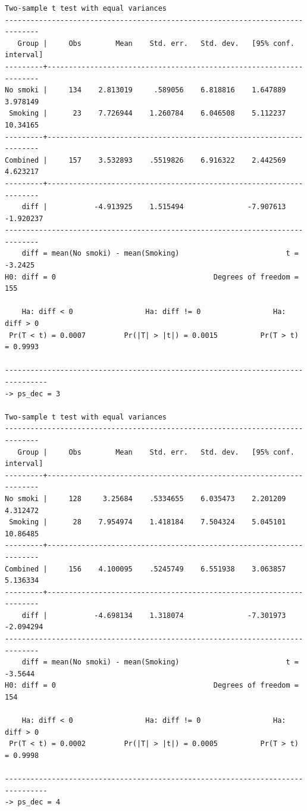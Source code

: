 \documentclass[
  10pt,
]{book}
\begin{document}
\begin{verbatim}
Two-sample t test with equal variances
------------------------------------------------------------------------------
   Group |     Obs        Mean    Std. err.   Std. dev.   [95% conf. interval]
---------+--------------------------------------------------------------------
No smoki |     134    2.813019     .589056    6.818816    1.647889    3.978149
 Smoking |      23    7.726944    1.260784    6.046508    5.112237    10.34165
---------+--------------------------------------------------------------------
Combined |     157    3.532893    .5519826    6.916322    2.442569    4.623217
---------+--------------------------------------------------------------------
    diff |           -4.913925    1.515494               -7.907613   -1.920237
------------------------------------------------------------------------------
    diff = mean(No smoki) - mean(Smoking)                         t =  -3.2425
H0: diff = 0                                     Degrees of freedom =      155

    Ha: diff < 0                 Ha: diff != 0                 Ha: diff > 0
 Pr(T < t) = 0.0007         Pr(|T| > |t|) = 0.0015          Pr(T > t) = 0.9993

--------------------------------------------------------------------------------
-> ps_dec = 3

Two-sample t test with equal variances
------------------------------------------------------------------------------
   Group |     Obs        Mean    Std. err.   Std. dev.   [95% conf. interval]
---------+--------------------------------------------------------------------
No smoki |     128     3.25684    .5334655    6.035473    2.201209    4.312472
 Smoking |      28    7.954974    1.418184    7.504324    5.045101    10.86485
---------+--------------------------------------------------------------------
Combined |     156    4.100095    .5245749    6.551938    3.063857    5.136334
---------+--------------------------------------------------------------------
    diff |           -4.698134    1.318074               -7.301973   -2.094294
------------------------------------------------------------------------------
    diff = mean(No smoki) - mean(Smoking)                         t =  -3.5644
H0: diff = 0                                     Degrees of freedom =      154

    Ha: diff < 0                 Ha: diff != 0                 Ha: diff > 0
 Pr(T < t) = 0.0002         Pr(|T| > |t|) = 0.0005          Pr(T > t) = 0.9998

--------------------------------------------------------------------------------
-> ps_dec = 4


\end{verbatim}
\end{document}
